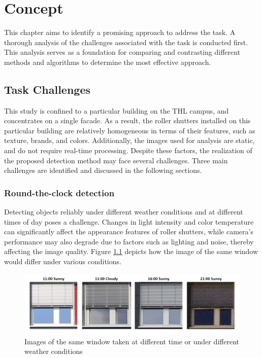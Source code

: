 \chapter{Concept}

This chapter aims to identify a promising approach to address the task. A thorough analysis of the challenges associated with the task is conducted first. This analysis serves as a foundation for comparing and contrasting different methods and algorithms to determine the most effective approach.

\section{Task Challenges}

This study is confined to a particular building on the THL campus, and concentrates on a single facade. As a result, the roller shutters installed on this particular building are relatively homogeneous in terms of their features, such as texture, brands, and colors. Additionally, the images used for analysis are static, and do not require real-time processing. Despite these factors, the realization of the proposed detection method may face several challenges. Three main challenges are identified and discussed in the following sections.

\subsection{Round-the-clock detection}

Detecting objects reliably under different weather conditions and at different times of day poses a challenge. Changes in light intensity and color temperature can significantly affect the appearance features of roller shutters, while camera's performance may also degrade due to factors such as lighting and noise, thereby affecting the image quality. Figure \ref{fig:8} depicts how the image of the same window would differ under various conditions. 

\begin{figure}[h]
  \centering
  \includegraphics[width=1\textwidth]{Figures/round-the-clock.png}
  \caption{Images of the same window taken at different time or under different weather conditions}
  \label{fig:8}  
\end{figure}


